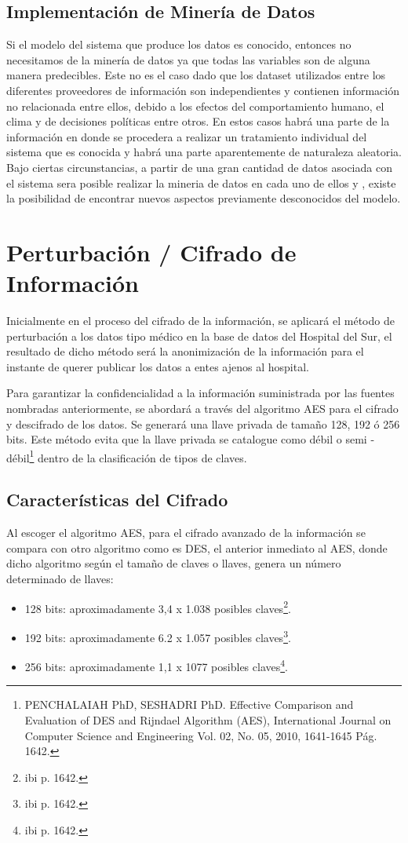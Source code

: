 \documentclass[a4paper,openright,12pt]{book}
\theoremstyle{definition}
\theoremstyle{remark}
\begin{document}
     \subsection{Implementación de Minería de Datos}
Si el modelo del sistema que produce los datos es conocido, entonces no necesitamos de la minería de datos ya que todas las variables son de alguna manera predecibles. Este no es el caso dado que los dataset utilizados entre los diferentes proveedores de información son independientes y contienen información no relacionada entre ellos, debido a los efectos del
comportamiento humano, el clima y de decisiones políticas
entre otros. En estos casos habrá una parte de la información en donde se procedera a realizar un tratamiento individual del sistema que es
conocida y habrá una parte aparentemente de naturaleza
aleatoria. Bajo ciertas circunstancias, a partir de una gran
cantidad de datos asociada con el sistema sera posible realizar la mineria de datos en cada uno de ellos y , existe la
posibilidad de encontrar nuevos aspectos previamente
desconocidos del modelo. 
\section{Perturbación / Cifrado de Información}
Inicialmente en el proceso del cifrado de la información, se aplicará el método de perturbación a los datos tipo médico en la base de datos del Hospital del Sur, el resultado de dicho método será la anonimización de la información para el instante de querer publicar los datos a entes ajenos al hospital.

Para garantizar la confidencialidad a la información suministrada por las fuentes nombradas anteriormente, se abordará a través del algoritmo AES para el cifrado y descifrado de los datos. Se generará una llave privada de tamaño 128, 192 ó 256 bits. Este método evita que la llave privada se catalogue como débil o semi - débil\footnote{PENCHALAIAH PhD, SESHADRI  PhD. Effective Comparison and Evaluation of DES and Rijndael Algorithm (AES), International Journal on Computer Science and Engineering Vol. 02, No. 05, 2010, 1641-1645 Pág. 1642.} dentro de la clasificación de tipos de claves.
    \subsection{Características del Cifrado}
    Al escoger el algoritmo AES, para el cifrado avanzado de la información se compara con otro algoritmo como es DES, el anterior inmediato al AES, donde dicho algoritmo según el tamaño de claves o llaves, genera un número determinado de llaves:
\begin{itemize}
	\item 128 bits: aproximadamente 3,4 x 1.038 posibles claves\footnote{ibi p. 1642.}.
    \item 192 bits: aproximadamente 6.2 x 1.057 posibles claves\footnote{ibi p. 1642.}.
    \item 256 bits: aproximadamente 1,1 x 1077 posibles claves\footnote{ibi p. 1642.}.
\end{itemize}
\end{document}
